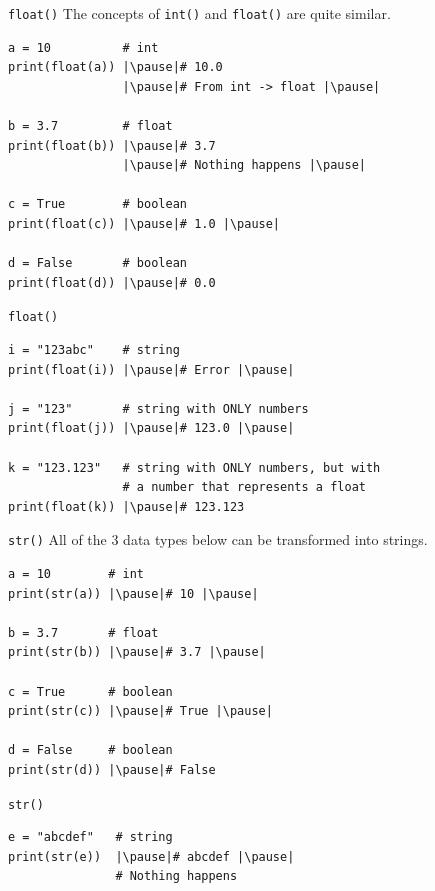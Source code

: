 \documentclass[dvipsnames, svgnames, x11names]{beamer}
\begin{document}
\begin{frame}[fragile]{\texttt{float()}}
The concepts of \texttt{int()} and \texttt{float()} are quite similar. \pause
\begin{verbatim} 
a = 10          # int
print(float(a)) |\pause|# 10.0
                |\pause|# From int -> float |\pause|

b = 3.7         # float
print(float(b)) |\pause|# 3.7
                |\pause|# Nothing happens |\pause|

c = True        # boolean
print(float(c)) |\pause|# 1.0 |\pause|

d = False       # boolean
print(float(d)) |\pause|# 0.0
\end{verbatim}
\end{frame}

\begin{frame}[fragile]{\texttt{float()}}
\begin{verbatim}
i = "123abc"    # string
print(float(i)) |\pause|# Error |\pause|
 
j = "123"       # string with ONLY numbers
print(float(j)) |\pause|# 123.0 |\pause|

k = "123.123"   # string with ONLY numbers, but with 
                # a number that represents a float
print(float(k)) |\pause|# 123.123
\end{verbatim}
\end{frame}

\begin{frame}[fragile]{\texttt{str()}}
All of the 3 data types below can be transformed into strings. \pause
\begin{verbatim} 
a = 10        # int
print(str(a)) |\pause|# 10 |\pause|

b = 3.7       # float
print(str(b)) |\pause|# 3.7 |\pause|

c = True      # boolean
print(str(c)) |\pause|# True |\pause|

d = False     # boolean
print(str(d)) |\pause|# False
\end{verbatim}
\end{frame}

\begin{frame}[fragile]{\texttt{str()}}
\begin{verbatim} 
e = "abcdef"   # string
print(str(e))  |\pause|# abcdef |\pause|
               # Nothing happens
\end{verbatim}
\end{frame}
\end{document}

